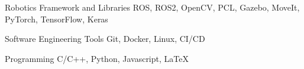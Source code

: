

\begin{cvskills}

  \cvskill
    {Robotics Framework and Libraries} %
    {ROS, ROS2, OpenCV, PCL, Gazebo, MoveIt, PyTorch, TensorFlow, Keras} %

  \cvskill
    {Software Engineering Tools}
    {Git, Docker, Linux, CI/CD} %

  \cvskill
    {Programming} %
    {C/C++, Python, Javascript, LaTeX} %


\end{cvskills}
